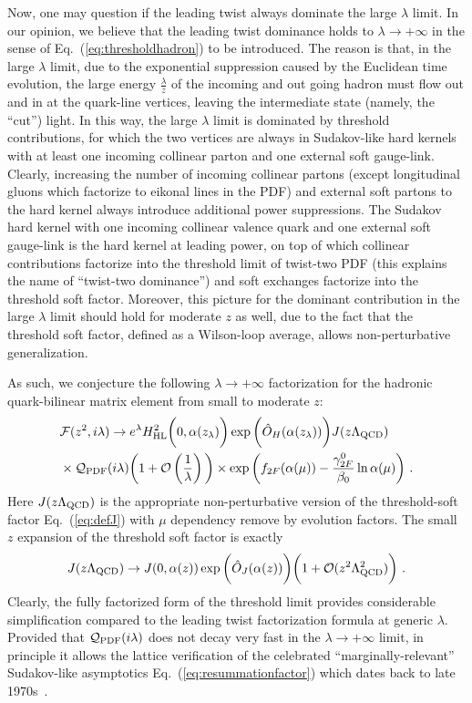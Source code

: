 \documentclass[a4paper,11pt]{article}
\begin{document}
Now, one may question if the leading twist always dominate the large $\lambda$ limit. In our opinion, we believe that the leading twist dominance holds to $\lambda \rightarrow +\infty$ in the sense of Eq.~(\ref{eq:thresholdhadron}) to be introduced. The reason is that, in the large $\lambda$ limit, due to the exponential suppression caused by the Euclidean time evolution, the large energy $\frac{\lambda}{z}$ of the incoming and out going hadron must flow out and in at the quark-line vertices, leaving the intermediate state (namely, the ``cut'') light. In this way, the large $\lambda$ limit is dominated by threshold contributions,  for which the two vertices are always in Sudakov-like hard kernels with at least one incoming collinear parton and one external soft gauge-link. Clearly, increasing the number of incoming collinear partons (except longitudinal gluons which factorize to eikonal lines in the PDF) and external soft partons to the hard kernel always introduce additional power suppressions. The Sudakov hard kernel with one incoming collinear valence quark and one external soft gauge-link is the hard kernel at leading power, on top of which collinear contributions factorize into the threshold limit of twist-two PDF (this explains the name of ``twist-two dominance'') and soft exchanges factorize into the threshold soft factor. Moreover, this picture for the dominant contribution in the large $\lambda $ limit should hold for moderate  $z$ as well, due to the fact that the threshold soft factor, defined as a Wilson-loop average, allows non-perturbative generalization. 

As such, we conjecture the following $\lambda \rightarrow +\infty$ factorization for the hadronic quark-bilinear matrix element from small to moderate $z$:
\begin{align}\label{eq:thresholdhadron}
&{\cal F}(z^2,i\lambda) \rightarrow e^{\lambda}H_{\rm HL}^2\bigg(0,\alpha(z_\lambda)\bigg)\exp \bigg(\hat O_H(\alpha(z_\lambda))\bigg)J(z\Lambda_{\rm QCD}) \nonumber \\ 
& \times  {\cal Q}_{\rm PDF}(i\lambda)\bigg(1+{\cal O} \left(\frac{1}{\lambda}\right)\bigg)\times \exp \bigg(f_{2F}(\alpha(\mu))-\frac{\gamma^0_{2F}}
{\beta_0}\ln \alpha(\mu)\bigg) \ .
\end{align}
Here $J(z\Lambda_{\rm QCD})$ is the appropriate non-perturbative version of the threshold-soft factor Eq.~(\ref{eq:defJ}) with $\mu$ dependency remove by evolution factors. The small $z$ expansion of the threshold soft factor is exactly 
\begin{align}
J(z\Lambda_{\rm QCD}) \rightarrow J(0,\alpha(z))\exp \bigg(\hat O_J(\alpha(z))\bigg)\bigg(1+{\cal O}(z^2\Lambda_{\rm QCD}^2)\bigg) \ .
\end{align}
Clearly, the fully factorized form of the threshold limit provides considerable simplification compared to the leading twist factorization formula at generic $\lambda$. Provided that ${\cal Q}_{\rm PDF}(i\lambda)$ does not decay very fast in the $\lambda \rightarrow +\infty$ limit, in principle it allows the lattice verification of the celebrated ``marginally-relevant'' Sudakov-like asymptotics Eq.~(\ref{eq:resummationfactor}) which dates back to late 1970s~\cite{Mueller:1979ih,Sen:1981sd}.
\end{document}
